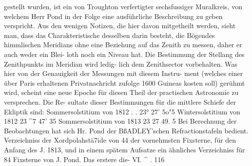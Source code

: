 \documentclass[12pt,a4paper]{article}
\begin{document}
gestellt wurden, ist ein von Troughton verfertigter sechsfussiger Muralkreis, von welchem Herr Pond\newline
in der Folge eine ausführliche Beschreibung zu geben verspricht. Aus den wenigen Notizen, die hier\newline
davon mitgetheilt werden, sieht man, dass das Charakteristische desselben darin besteht, die Bögendes\newline
himmlischen Meridians ohne eine Beziehung auf das Zenith zu messen, daher er auch weder ein Blei-\newline
loth noch ein Niveau hat. Die Bestimmung der Stellang des Zenithpunkts im Meridian wird ledig-\newline
lich dem Zenithsector vorbehalten. Was hier von der Genauigkeit der Messungen mit diesem Instru-\newline
ment (welches einer über Paris erhaltenen Privatnachricht zufolge 1600 Guineas kosten soll) gerühmt\newline
wird, scheint eine neue Epoche für diesen Theil der practischen Astronomie zu versprechen. Die Re-\newline
sultate dieser Bestimmungen für die mittlere Schiefe der Ekliptik sind:\newline
Sommersolstitium von 1812 . . \textbullet{} 23° 27' 5o"5\newline
Wintersolstitium von 1812 23 \^{}7 47' 35\newline
Sommersolstitium von 1813 23 27 49. 5\newline
Bei Berechnung der Beobachtungen hat sich Hr. Pond der BßADLEY'schen Refractionstafeln bedient.\newline
Verzeichniss der Xordpolahstä7ide von 44 der vornehmsten Fixsterne, für den Anfang des J. 1813,\newline
und in einem spätem Aufsatze ein ähnliches Verzeichniss für 84 Fixsterne von J. Pond. Das erstere die-\newline
VI. \^{} . 116\newline
\end{document}
